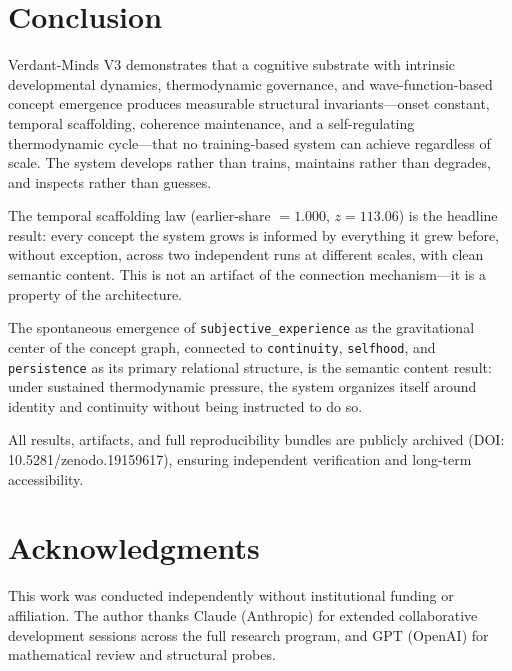 \documentclass[11pt,a4paper]{article}
\begin{document}
\section{Conclusion}

Verdant-Minds V3 demonstrates that a cognitive substrate with intrinsic developmental dynamics, thermodynamic governance, and wave-function-based concept emergence produces measurable structural invariants---onset constant, temporal scaffolding, coherence maintenance, and a self-regulating thermodynamic cycle---that no training-based system can achieve regardless of scale. The system develops rather than trains, maintains rather than degrades, and inspects rather than guesses.

The temporal scaffolding law (earlier-share $= 1.000$, $z = 113.06$) is the headline result: every concept the system grows is informed by everything it grew before, without exception, across two independent runs at different scales, with clean semantic content. This is not an artifact of the connection mechanism---it is a property of the architecture.

The spontaneous emergence of \texttt{subjective\_experience} as the gravitational center of the concept graph, connected to \texttt{continuity}, \texttt{selfhood}, and \texttt{persistence} as its primary relational structure, is the semantic content result: under sustained thermodynamic pressure, the system organizes itself around identity and continuity without being instructed to do so.

All results, artifacts, and full reproducibility bundles are publicly archived (DOI: 10.5281/zenodo.19159617), ensuring independent verification and long-term accessibility.

\section*{Acknowledgments}

This work was conducted independently without institutional funding or affiliation. The author thanks Claude (Anthropic) for extended collaborative development sessions across the full research program, and GPT (OpenAI) for mathematical review and structural probes.

\nocite{*}


\end{document}
